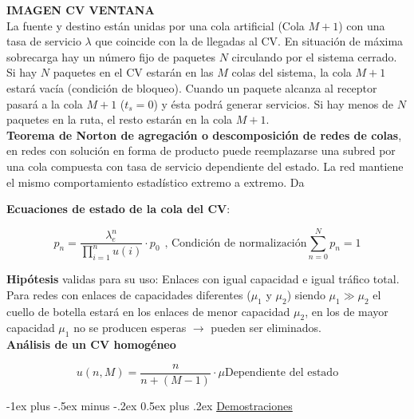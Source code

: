 \documentclass[9pt,landscape]{article}
\makeatletter
\renewcommand{\section}{\@startsection{section}{1}{0mm}%
                                {-1ex plus -.5ex minus -.2ex}%
                                {0.5ex plus .2ex}%
                                {\normalfont\large\bfseries}}
\makeatother
\begin{document}
\begin{multicols}{3}
	
	\textbf{IMAGEN CV VENTANA}\\
	
La fuente y destino están unidas por una cola artificial (Cola $M+1$) con una tasa de servicio $\lambda$ que coincide con la de llegadas al CV. En situación de máxima sobrecarga hay un número fijo de paquetes $N$ circulando por el sistema cerrado. Si hay $N$ paquetes en el CV estarán en las $M$ colas del sistema, la cola $M+1$ estará vacía (condición de bloqueo). Cuando un paquete alcanza al receptor pasará a la cola $M+1$ ($t_s = 0$) y ésta podrá generar servicios. Si hay menos de $N$ paquetes en la ruta, el resto estarán en la cola $M+1$.\\

\textbf{Teorema de Norton de agregación o descomposición de redes de colas}, en redes con solución en forma de producto puede reemplazarse una subred por una cola compuesta con tasa de servicio dependiente del estado. La red mantiene el mismo comportamiento estadístico extremo a extremo. Da

\textbf{Ecuaciones de estado de la cola del CV}:

	\begin{equation*}
		p_{n} = \frac{\lambda_{e}^{n}}{\prod_{i = 1}^{n} u(i)} \cdot p_{0} \hspace{5pt} \text{, Condición de normalización} \sum_{n = 0}^{N} p_{n} = 1
	\end{equation*}

\textbf{Hipótesis} validas para su uso:
	\quad Enlaces con igual capacidad e igual tráfico total.\\
	\quad Para redes con enlaces de capacidades diferentes ($\mu_{1}$ y $\mu_{2}$) siendo $\mu_{1} \gg \mu_{2}$ el cuello de botella estará en los enlaces de menor capacidad $\mu_{2}$, en los de mayor capacidad $\mu_{1}$ no se producen esperas $\rightarrow$ pueden ser eliminados.\\
	
	\quad \textbf{Análisis de un CV homogéneo}
	
	\begin{equation*}
		u(n,M) = \frac{n}{n + (M-1)} \cdot \mu \text{Dependiente del estado}
	\end{equation*}
	
	
	



\newpage

\section{\underline{Demostraciones}}


\end{multicols}
\end{document}
